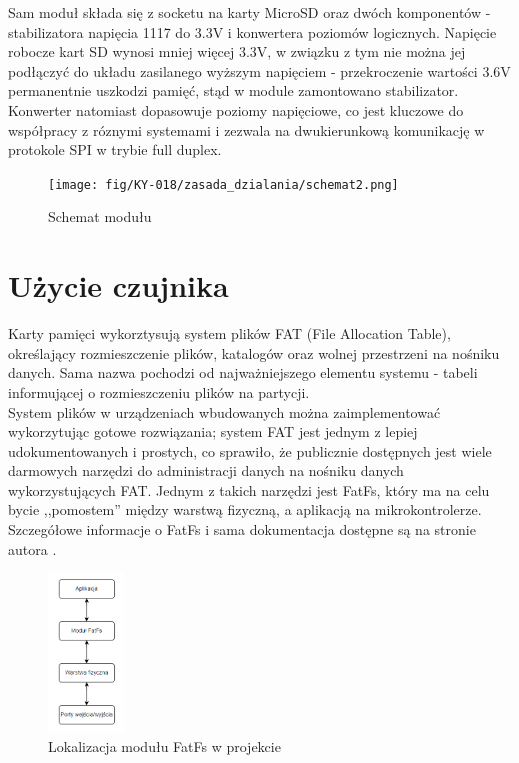 \documentclass[11pt, a4paper]{article}
\begin{document}
Sam moduł składa się z socketu na karty MicroSD oraz dwóch komponentów - stabilizatora napięcia 1117 do 3.3V i konwertera poziomów logicznych. Napięcie robocze kart SD wynosi mniej więcej 3.3V, w związku z tym nie można jej podłączyć do układu zasilanego wyższym napięciem - przekroczenie wartości 3.6V permanentnie uszkodzi pamięć, stąd w module zamontowano stabilizator. Konwerter natomiast dopasowuje poziomy napięciowe, co jest kluczowe do współpracy z róznymi systemami i zezwala na dwukierunkową komunikację w protokole SPI w trybie full duplex.

\begin{figure}[h!]
\centering
\texttt{[image: fig/KY-018/zasada\_dzialania/schemat2.png]}
\caption{Schemat modułu}
\label{fig:sub2}
\end{figure}

\newpage
\section*{Użycie czujnika}
Karty pamięci wykorztysują system plików FAT (File Allocation Table), określający rozmieszczenie plików, katalogów oraz wolnej przestrzeni na nośniku danych. Sama nazwa pochodzi od najważniejszego elementu systemu - tabeli informującej o rozmieszczeniu plików na partycji. \\
System plików w urządzeniach wbudowanych można zaimplementować wykorzytując gotowe rozwiązania; system FAT jest jednym z lepiej udokumentowanych i prostych, co sprawiło, że publicznie dostępnych jest wiele darmowych narzędzi do administracji danych na nośniku danych wykorzystujących FAT. Jednym z takich narzędzi jest FatFs, który ma na celu bycie ,,pomostem''  między warstwą fizyczną, a aplikacją na mikrokontrolerze. Szczegółowe informacje o FatFs i sama dokumentacja dostępne są na stronie autora \cite{SD:FatFs}.

\vspace{0.5cm}
\begin{figure}[h!]
    \centering
    \includegraphics[width=0.18\textwidth]{fig/KY-018/działanie_ukladu/fatfs.png}
    \caption{Lokalizacja modułu FatFs w projekcie}
    \label{fig:my_label}
\end{figure}
\end{document}
